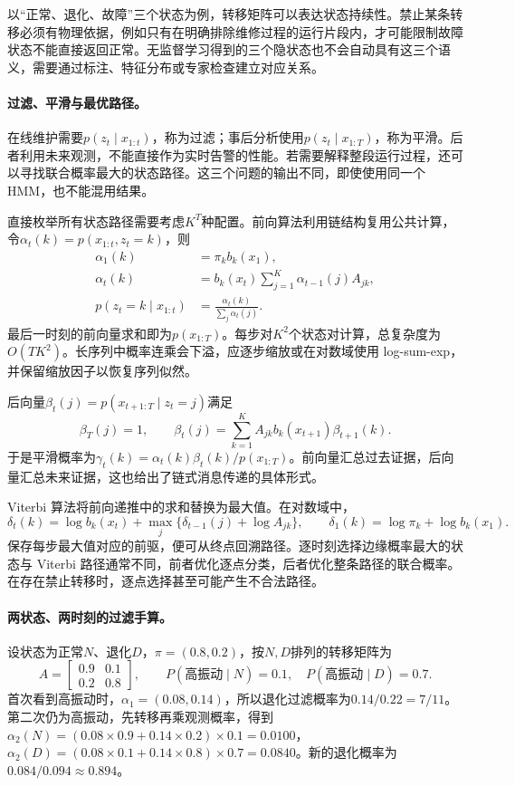 以“正常、退化、故障”三个状态为例，转移矩阵可以表达状态持续性。禁止某条转移必须有物理依据，例如只有在明确排除维修过程的运行片段内，才可能限制故障状态不能直接返回正常。无监督学习得到的三个隐状态也不会自动具有这三个语义，需要通过标注、特征分布或专家检查建立对应关系。

\paragraph{过滤、平滑与最优路径。}
在线维护需要$p(z_t\mid x_{1:t})$，称为过滤；事后分析使用$p(z_t\mid x_{1:T})$，称为平滑。后者利用未来观测，不能直接作为实时告警的性能。若需要解释整段运行过程，还可以寻找联合概率最大的状态路径。这三个问题的输出不同，即使使用同一个 HMM，也不能混用结果。

直接枚举所有状态路径需要考虑$K^T$种配置。前向算法利用链结构复用公共计算，令$\alpha_t(k)=p(x_{1:t},z_t=k)$，则
\begin{align}
 \alpha_1(k)&=\pi_kb_k(x_1),\\
 \alpha_t(k)&=b_k(x_t)\sum_{j=1}^{K}\alpha_{t-1}(j)A_{jk},\\
 p(z_t=k\mid x_{1:t})&=\frac{\alpha_t(k)}{\sum_j\alpha_t(j)}.
\end{align}
最后一时刻的前向量求和即为$p(x_{1:T})$。每步对$K^2$个状态对计算，总复杂度为$O(TK^2)$。长序列中概率连乘会下溢，应逐步缩放或在对数域使用 log-sum-exp，并保留缩放因子以恢复序列似然。

后向量$\beta_t(j)=p(x_{t+1:T}\mid z_t=j)$满足
\begin{equation}
 \beta_T(j)=1,\qquad
 \beta_t(j)=\sum_{k=1}^{K}A_{jk}b_k(x_{t+1})\beta_{t+1}(k).
\end{equation}
于是平滑概率为$\gamma_t(k)=\alpha_t(k)\beta_t(k)/p(x_{1:T})$。前向量汇总过去证据，后向量汇总未来证据，这也给出了链式消息传递的具体形式。

Viterbi 算法将前向递推中的求和替换为最大值。在对数域中，
\begin{equation}
 \delta_t(k)=\log b_k(x_t)+\max_j\{\delta_{t-1}(j)+\log A_{jk}\},
 \qquad \delta_1(k)=\log\pi_k+\log b_k(x_1).
\end{equation}
保存每步最大值对应的前驱，便可从终点回溯路径。逐时刻选择边缘概率最大的状态与 Viterbi 路径通常不同，前者优化逐点分类，后者优化整条路径的联合概率。在存在禁止转移时，逐点选择甚至可能产生不合法路径。

\paragraph{两状态、两时刻的过滤手算。}
设状态为正常$N$、退化$D$，$\pi=(0.8,0.2)$，按$N,D$排列的转移矩阵为
\begin{equation}
 A=\begin{bmatrix}0.9&0.1\\0.2&0.8\end{bmatrix},\qquad
 P(\text{高振动}\mid N)=0.1,\quad P(\text{高振动}\mid D)=0.7.
\end{equation}
首次看到高振动时，$\alpha_1=(0.08,0.14)$，所以退化过滤概率为$0.14/0.22=7/11$。第二次仍为高振动，先转移再乘观测概率，得到$\alpha_2(N)=(0.08\times0.9+0.14\times0.2)\times0.1=0.0100$，$\alpha_2(D)=(0.08\times0.1+0.14\times0.8)\times0.7=0.0840$。新的退化概率为$0.084/0.094\approx0.894$。

